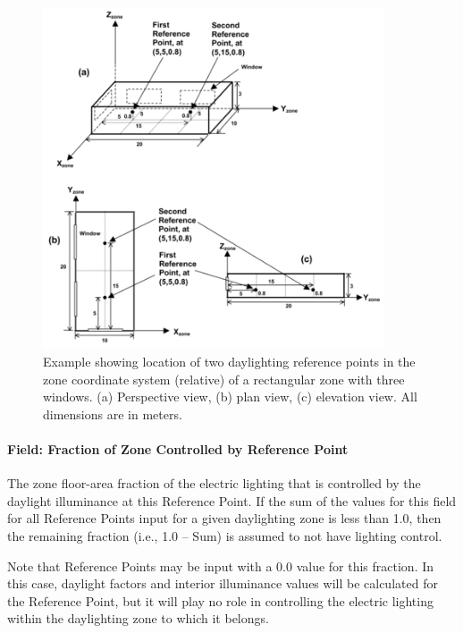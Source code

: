 \begin{figure}[hbtp] %
\centering
\includegraphics[width=0.9\textwidth, height=0.9\textheight, keepaspectratio=true]{media/image107.png}
\caption{Example showing location of two daylighting reference points in the zone coordinate system (relative) of a rectangular zone with three windows. (a) Perspective view, (b) plan view, (c) elevation view. All dimensions are in meters. \protect \label{fig:example-showing-location-of-two-daylighting}}
\end{figure}

\paragraph{Field: Fraction of Zone Controlled by Reference Point}\label{field-fraction-of-zone-controlled-by-reference-point}

The zone floor-area fraction of the electric lighting that is controlled by the daylight illuminance at this Reference Point. If the sum of the values for this field for all Reference Points input for a given daylighting zone is less than 1.0, then the remaining fraction (i.e., 1.0 -- Sum) is assumed to not have lighting control.

Note that Reference Points may be input with a 0.0 value for this fraction. In this case, daylight factors and interior illuminance values will be calculated for the Reference Point, but it will play no role in controlling the electric lighting within the daylighting zone to which it belongs.

